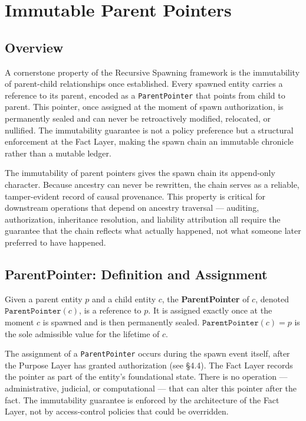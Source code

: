 \section{Immutable Parent Pointers}

\subsection{Overview}
A cornerstone property of the Recursive Spawning framework is the immutability of parent-child relationships once established. Every spawned entity carries a reference to its parent, encoded as a \texttt{ParentPointer} that points from child to parent. This pointer, once assigned at the moment of spawn authorization, is permanently sealed and can never be retroactively modified, relocated, or nullified. The immutability guarantee is not a policy preference but a structural enforcement at the Fact Layer, making the spawn chain an immutable chronicle rather than a mutable ledger.

The immutability of parent pointers gives the spawn chain its append-only character. Because ancestry can never be rewritten, the chain serves as a reliable, tamper-evident record of causal provenance. This property is critical for downstream operations that depend on ancestry traversal — auditing, authorization, inheritance resolution, and liability attribution all require the guarantee that the chain reflects what actually happened, not what someone later preferred to have happened.

\subsection{ParentPointer: Definition and Assignment}

\begin{definition}[ParentPointer]
Given a parent entity $p$ and a child entity $c$, the \textbf{ParentPointer} of $c$, denoted $\texttt{ParentPointer}(c)$, is a reference to $p$. It is assigned exactly once at the moment $c$ is spawned and is then permanently sealed. $\texttt{ParentPointer}(c) = p$ is the sole admissible value for the lifetime of $c$.
\end{definition}

The assignment of a \texttt{ParentPointer} occurs during the spawn event itself, after the Purpose Layer has granted authorization (see \S4.4). The Fact Layer records the pointer as part of the entity's foundational state. There is no operation — administrative, judicial, or computational — that can alter this pointer after the fact. The immutability guarantee is enforced by the architecture of the Fact Layer, not by access-control policies that could be overridden.


